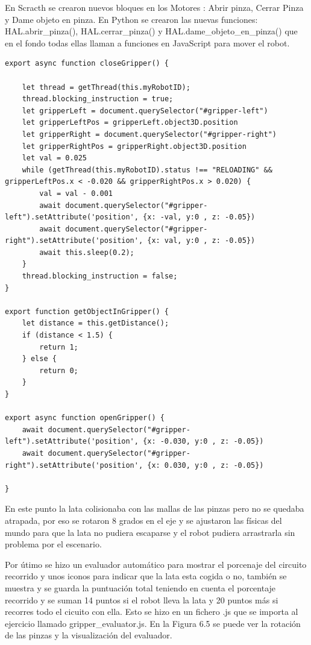  En Scracth se crearon nuevos bloques en los Motores : Abrir pinza, Cerrar Pinza y Dame objeto en pinza.
 En Python  se crearon las nuevas funciones: HAL.abrir\_pinza(), HAL.cerrar\_pinza() y  HAL.dame\_objeto\_en\_pinza() que en el fondo todas ellas llaman a funciones en JavaScript para mover el robot.
 
\begin{lstlisting}
export async function closeGripper() {

    let thread = getThread(this.myRobotID);
    thread.blocking_instruction = true;
    let gripperLeft = document.querySelector("#gripper-left")
    let gripperLeftPos = gripperLeft.object3D.position
    let gripperRight = document.querySelector("#gripper-right")
    let gripperRightPos = gripperRight.object3D.position
    let val = 0.025
    while (getThread(this.myRobotID).status !== "RELOADING" && gripperLeftPos.x < -0.020 && gripperRightPos.x > 0.020) {
        val = val - 0.001
        await document.querySelector("#gripper-left").setAttribute('position', {x: -val, y:0 , z: -0.05})
        await document.querySelector("#gripper-right").setAttribute('position', {x: val, y:0 , z: -0.05})
        await this.sleep(0.2);
    }
    thread.blocking_instruction = false;
}

export function getObjectInGripper() {
    let distance = this.getDistance();
    if (distance < 1.5) {
        return 1;
    } else {
        return 0;
    }
}

export async function openGripper() {
    await document.querySelector("#gripper-left").setAttribute('position', {x: -0.030, y:0 , z: -0.05})
    await document.querySelector("#gripper-right").setAttribute('position', {x: 0.030, y:0 , z: -0.05})

}
\end{lstlisting}

 
En este punto la lata colisionaba con las mallas de las pinzas pero no se quedaba atrapada,  por eso se rotaron 8  grados en el eje y se ajustaron las físicas del mundo para que la lata no pudiera escaparse y el robot pudiera arrastrarla sin problema por el escenario.

Por útimo se hizo un evaluador automático para mostrar el porcenaje del circuito recorrido y unos iconos para indicar que la lata esta cogida o no, también se muestra y se guarda la puntuación total teniendo en cuenta el  porcentaje recorrido  y se suman 14 puntos si el robot lleva la lata y 20 puntos más si recorres todo el cicuito con ella. Esto se hizo en un fichero .js que se importa al ejercicio llamado gripper\_evaluator.js. En la Figura 6.5 se puede ver la rotación de las pinzas y la visualización del evaluador.

